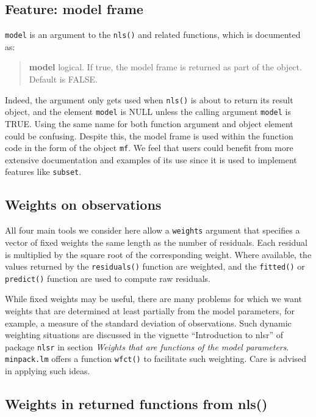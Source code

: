 \hypertarget{feature-model-frame}{%
\subsection{Feature: model frame}\label{feature-model-frame}}

\texttt{model} is an argument to the \texttt{nls()} and related functions, which is documented as:

\begin{quote}
\textbf{model} logical. If true, the model frame is returned as part of the object. Default is FALSE.
\end{quote}

Indeed, the argument only gets used when \texttt{nls()} is about to return its result
object, and the
element \texttt{model} is NULL unless the calling argument \texttt{model} is TRUE. Using the
same name for both function argument and object element could be confusing.
Despite this, the model frame is used within the function code in
the form of the object
\texttt{mf}. We feel that users could benefit from more extensive documentation and
examples of its use since it is used to implement features like \texttt{subset}.

\hypertarget{weights-on-observations}{%
\subsection{Weights on observations}\label{weights-on-observations}}

All four main tools we consider here allow a \texttt{weights} argument that
specifies a vector of fixed weights the same length as the number of residuals.
Each residual is multiplied by the square root of the corresponding weight.
Where available, the values returned by the
\texttt{residuals()} function are weighted, and the \texttt{fitted()} or \texttt{predict()} function are
used to compute raw residuals.

While fixed weights may be useful, there are many problems for which
we want weights that are determined at least partially from the model
parameters, for
example, a measure of the standard deviation of observations.
Such dynamic weighting situations are discussed in the vignette
``Introduction to nlsr'' of package \texttt{nlsr} in section
\emph{Weights that are functions of the model parameters}.
\texttt{minpack.lm} offers a function \texttt{wfct()} to
facilitate such weighting. Care is advised
in applying such ideas.

\hypertarget{weights-in-returned-functions-from-nls}{%
\subsection{Weights in returned functions from nls()}\label{weights-in-returned-functions-from-nls}}

